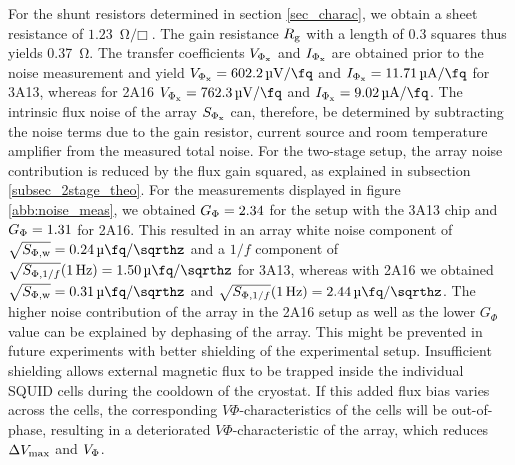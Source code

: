 For the shunt resistors determined in section \ref{sec_charac}, we obtain a sheet resistance of $\qty{1.23}{\ohm\per\Box}$. The gain resistance $R_{\rm g}$ with a length of 0.3 squares thus yields \qty{0.37}{\ohm}. The transfer coefficients $V_{\rm \Phi_x}$ and $I_{\rm \Phi_x}$ are obtained prior to the noise measurement and yield $V_{\rm \Phi_x}=\qty{602.2}{\micro\volt\per\fq}$ and $I_{\rm \Phi_x}=\qty{11.71}{\micro\ampere\per\fq}$ for 3A13, whereas for 2A16 $V_{\rm \Phi_x}=\qty{762.3}{\micro\volt\per\fq}$ and $I_{\rm \Phi_x}=\qty{9.02}{\micro\ampere\per\fq}$. The intrinsic flux noise of the array $S_{\rm \Phi_x}$ can, therefore, be determined by subtracting the noise terms due to the gain resistor, current source and room temperature amplifier from the measured total noise. For the two-stage setup, the array noise contribution is reduced by the flux gain squared, as explained in subsection \ref{subsec_2stage_theo}. For the measurements displayed in figure \ref{abb:noise_meas}, we obtained $G_{\rm \Phi}=2.34$ for the setup with the 3A13 chip and $G_{\rm \Phi}=1.31$ for 2A16. This resulted in an array white noise component of $\sqrt{S_{\rm \Phi,w}}=\qty{0.24}{\micro\fq\per\sqrthz}$ and a $1/f$ component of $\sqrt{S_{{\rm \Phi},1/f}}(\qty{1}{\Hz})=\qty{1.50}{\micro\fq\per\sqrthz}$ for 3A13, whereas with 2A16 we obtained $\sqrt{S_{\rm \Phi,w}}=\qty{0.31}{\micro\fq\per\sqrthz}$ and $\sqrt{S_{{\rm \Phi},1/f}}(\qty{1}{\Hz})=\qty{2.44}{\micro\fq\per\sqrthz}$. The higher noise contribution of the array in the 2A16 setup as well as the lower $G_\Phi$ value can be explained by dephasing of the array. This might be prevented in future experiments with better shielding of the experimental setup. Insufficient shielding allows external magnetic flux to be trapped inside the individual SQUID cells during the cooldown of the cryostat. If this added flux bias varies across the cells, the corresponding $V\Phi$-characteristics of the cells will be out-of-phase, resulting in a deteriorated $V\Phi$-characteristic of the array, which reduces $\Delta V_{\rm max}$ and $V_{\rm \Phi}$. \\

